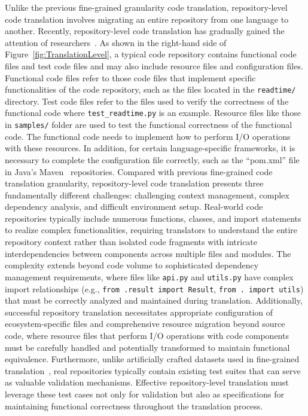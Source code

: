 Unlike the previous fine-grained granularity code translation, repository-level code translation involves migrating an entire repository from one language to another. Recently, repository-level code translation has gradually gained the attention of researchers~\cite{pan2024lost}. As shown in the right-hand side of Figure~\ref{fig:TranslationLevel}, a typical code repository contains functional code files and test code files and may also include resource files and configuration files. Functional code files refer to those code files that implement specific functionalities of the code repository, such as the files located in the \texttt{readtime/} directory. Test code files refer to the files used to verify the correctness of the functional code where \texttt{test_readtime.py} is an example. Resource files like those in \texttt{samples/} folder are used to test the functional correctness of the functional code. The functional code needs to implement how to perform I/O operations with these resources. In addition, for certain language-specific frameworks, it is necessary to complete the configuration file correctly, such as the ``pom.xml'' file in Java's Maven~\cite{maven} repositories.
Compared with previous fine-grained code translation granularity, repository-level code translation presents three fundamentally different challenges: challenging context management, complex dependency analysis, and difficult environment setup. Real-world code repositories typically include numerous functions, classes, and import statements to realize complex functionalities, requiring translators to understand the entire repository context rather than isolated code fragments with intricate interdependencies between components across multiple files and modules. The complexity extends beyond code volume to sophisticated dependency management requirements, where files like \texttt{api.py} and \texttt{utils.py} have complex import relationships (e.g., \texttt{from .result import Result}, \texttt{from . import utils}) that must be correctly analyzed and maintained during translation. Additionally, successful repository translation necessitates appropriate configuration of ecosystem-specific files and comprehensive resource migration beyond source code, where resource files that perform I/O operations with code components must be carefully handled and potentially transformed to maintain functional equivalence.
Furthermore, unlike artificially crafted datasets used in fine-grained translation~\cite{ahmad2021avatar,puri2021codenet}, real repositories typically contain existing test suites that can serve as valuable validation mechanisms. Effective repository-level translation must leverage these test cases not only for validation but also as specifications for maintaining functional correctness throughout the translation process.

